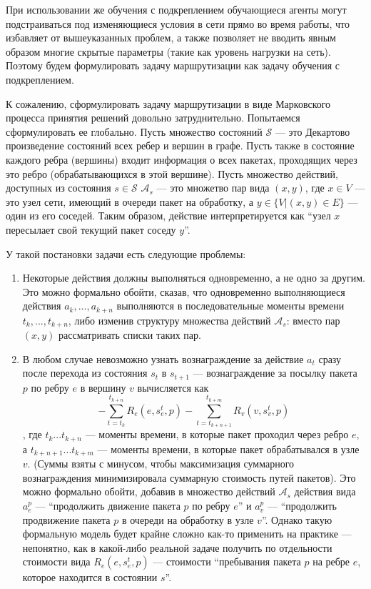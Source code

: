 \documentclass[specification, annotation]{itmo-student-thesis}
\begin{document}
При использовании же обучения с подкреплением обучающиеся агенты могут
подстраиваться под изменяющиеся условия в сети прямо во время работы, что
избавляет от вышеуказанных проблем, а также позволяет не вводить явным образом
многие скрытые параметры (такие как уровень нагрузки на сеть). Поэтому будем
формулировать задачу маршрутизации как задачу обучения с подкреплением.

К сожалению, сформулировать задачу маршрутизации в виде Марковского процесса
принятия решений довольно затруднительно. Попытаемся сформулировать ее
глобально. Пусть множество состояний $\mathcal{S}$ --- это Декартово произведение
состояний всех ребер и вершин в графе. Пусть также в состояние каждого ребра
(вершины) входит информация о всех пакетах, проходящих через это ребро
(обрабатывающихся в этой вершине). Пусть множество действий, доступных из
состояния $s \in \mathcal{S}$ $\mathcal{A}_s$ --- это множетво пар вида $(x,y)$,
где $x \in V$ --- это узел сети, имеющий в очереди пакет на обработку, а
$y \in \{V | (x, y) \in E\}$ --- один из его соседей. Таким образом, действие
интерпретируется как \enquote{узел $x$ пересылает свой текущий пакет соседу $y$}.

У такой постановки задачи есть следующие проблемы:
\begin{enumerate}
\item Некоторые действия должны выполняться одновременно, а не одно за другим.
  Это можно формально обойти, сказав, что одновременно выполняющиеся действия
  $a_k, ... , a_{k+n}$ выполняются в последовательные моменты времени
  $t_k, ... , t_{k+n}$, либо изменив структуру множества действий
  $\mathcal{A}_s$: вместо пар $(x, y)$ рассматривать списки таких пар.
\item В любом случае невозможно узнать вознаграждение за действие $a_t$ сразу
  после перехода из состояния $s_t$ в $s_{t+1}$ --- вознаграждение за посылку
  пакета $p$ по ребру $e$ в вершину $v$ вычисляется как
  \[
  - \sum\limits_{t=t_k}^{t_{k+n}} {R_e(e, s_e^t, p)} -
  \sum\limits_{t=t_{k+n+1}}^{t_{k+m}} R_v(v, s_v^t, p)
  \]
  , где $t_k ... t_{k+n}$ --- моменты времени, в которые пакет проходил через
  ребро $e$, а $t_{k+n+1} ... t_{k+m}$ --- моменты времени, в которые пакет
  обрабатывался в узле $v$. (Суммы взяты с минусом, чтобы максимизация
  суммарного вознаграждения минимизировала суммарную стоимость путей пакетов).
  Это можно формально обойти, добавив в множество действий $\mathcal{A}_s$
  действия вида $a_e^p$ --- \enquote{продолжить движение пакета
  $p$ по ребру $e$} и $a_v^p$ --- \enquote{продолжить продвижение пакета $p$ в очереди на
  обработку в узле $v$}. Однако такую формальную модель будет крайне сложно
  как-то применить на практике --- непонятно, как в какой-либо реальной задаче
  получить по отдельности стоимости вида $R_e(e, s_e^t, p)$ --- стоимости
  \enquote{пребывания пакета $p$ на ребре $e$, которое находится в состоянии $s$}.
\end{enumerate}
\end{document}
